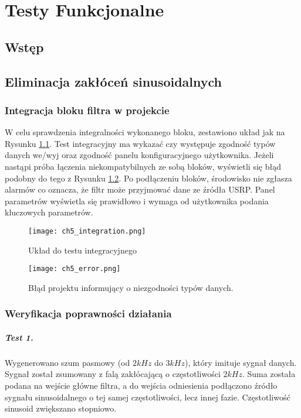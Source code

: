 \chapter{Testy Funkcjonalne}
\section{Wstęp}
\section{Eliminacja zakłóceń sinusoidalnych}
\subsection{Integracja bloku filtra w projekcie}

W celu sprawdzenia integralności wykonanego bloku, zestawiono układ jak na Rysunku \ref{fig:itest}.
Test integracyjny ma wykazać czy występuje zgodność typów danych we/wyj oraz zgodność panelu konfiguracyjnego użytkownika.
Jeżeli nastąpi próba łączenia niekompatybilnych ze sobą bloków, wyświetli się błąd podobny do tego z Rysunku \ref{fig:error}.
Po podłączeniu bloków, środowisko nie zgłasza alarmów co oznacza, że filtr może przyjmować dane ze źródła USRP. 
Panel parametrów wyświetla się prawidłowo i wymaga od użytkownika podania kluczowych parametrów.
  
\begin{figure}[ht]
\centering
\texttt{[image: ch5\_integration.png]}
\caption{Układ do testu integracyjnego}
\label{fig:itest}
\end{figure}


\begin{figure}[ht]
\centering
\texttt{[image: ch5\_error.png]}
\caption{Błąd projektu informujący o niezgodności typów danych.}
\label{fig:error}
\end{figure}
\subsection{Weryfikacja poprawności działania}

\paragraph{Test 1.}
Wygenerowano szum pasmowy (od $2kHz$ do $3kHz$), który imituje sygnał danych.
Sygnał został zsumowany z falą zakłócającą o częstotliwości $2kHz$.
Suma została podana na wejście główne filtra, a do wejścia odniesienia podłączono źródło sygnału sinusoidalnego o tej samej częstotliwości, lecz innej fazie.
Częstotliwość sinusoid zwiększano stopniowo.

